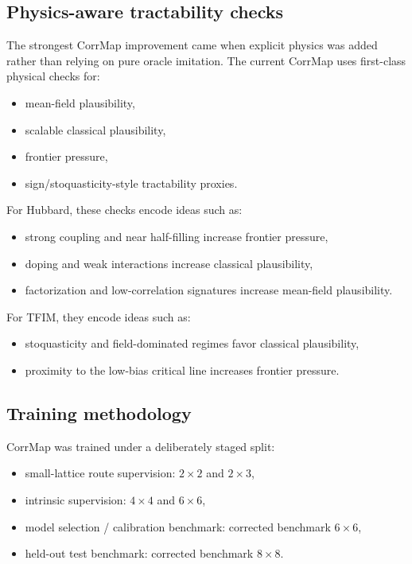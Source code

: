 \documentclass[11pt]{article}
\begin{document}
\subsection{Physics-aware tractability checks}

The strongest CorrMap improvement came when explicit physics was added rather than relying on pure oracle imitation. The current CorrMap uses first-class physical checks for:

\begin{itemize}
\item mean-field plausibility,
\item scalable classical plausibility,
\item frontier pressure,
\item sign/stoquasticity-style tractability proxies.
\end{itemize}

For Hubbard, these checks encode ideas such as:

\begin{itemize}
\item strong coupling and near half-filling increase frontier pressure,
\item doping and weak interactions increase classical plausibility,
\item factorization and low-correlation signatures increase mean-field plausibility.
\end{itemize}

For TFIM, they encode ideas such as:

\begin{itemize}
\item stoquasticity and field-dominated regimes favor classical plausibility,
\item proximity to the low-bias critical line increases frontier pressure.
\end{itemize}

\subsection{Training methodology}

CorrMap was trained under a deliberately staged split:

\begin{itemize}
\item small-lattice route supervision: \(2\times 2\) and \(2\times 3\),
\item intrinsic supervision: \(4\times 4\) and \(6\times 6\),
\item model selection / calibration benchmark: corrected benchmark \(6\times 6\),
\item held-out test benchmark: corrected benchmark \(8\times 8\).
\end{itemize}
\end{document}
